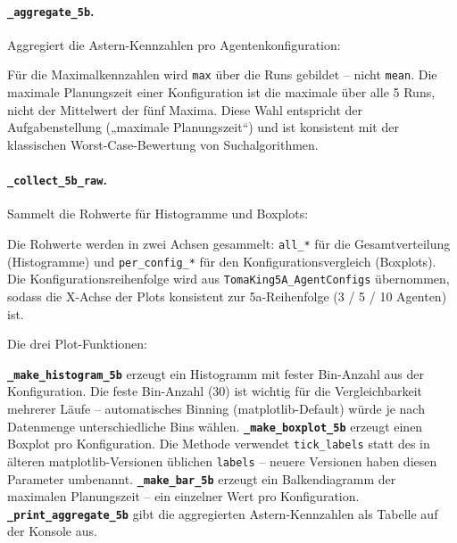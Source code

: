 

\paragraph{\texttt{\_aggregate\_5b}.}
Aggregiert die \acs{Astern}-Kennzahlen pro Agentenkonfiguration:



Für die Maximalkennzahlen wird \texttt{max} über die Runs gebildet -- nicht \texttt{mean}. Die maximale Planungszeit einer Konfiguration ist die maximale über alle 5 Runs, nicht der Mittelwert der fünf Maxima. Diese Wahl entspricht der Aufgabenstellung („maximale Planungszeit``) und ist konsistent mit der klassischen Worst-Case-Bewertung von Suchalgorithmen.

\paragraph{\texttt{\_collect\_5b\_raw}.}
Sammelt die Rohwerte für Histogramme und Boxplots:



Die Rohwerte werden in zwei Achsen gesammelt: \texttt{all\_*} für die Gesamtverteilung (Histogramme) und \texttt{per\_config\_*} für den Konfigurationsvergleich (Boxplots). Die Konfigurationsreihenfolge wird aus \texttt{TomaKing5A\_AgentConfigs} übernommen, sodass die X-Achse der Plots konsistent zur 5a-Reihenfolge (3 / 5 / 10 Agenten) ist.

Die drei Plot-Funktionen:



\textbf{\texttt{\_make\_histogram\_5b}} erzeugt ein Histogramm mit fester Bin-Anzahl aus der Konfiguration. Die feste Bin-Anzahl (30) ist wichtig für die Vergleichbarkeit mehrerer Läufe -- automatisches Binning (matplotlib-Default) würde je nach Datenmenge unterschiedliche Bins wählen.
\textbf{\texttt{\_make\_boxplot\_5b}} erzeugt einen Boxplot pro Konfiguration. Die Methode verwendet \texttt{tick\_labels} statt des in älteren matplotlib-Versionen üblichen \texttt{labels} -- neuere Versionen haben diesen Parameter umbenannt.
\textbf{\texttt{\_make\_bar\_5b}} erzeugt ein Balkendiagramm der maximalen Planungszeit -- ein einzelner Wert pro Konfiguration.
\textbf{\texttt{\_print\_aggregate\_5b}} gibt die aggregierten \acs{Astern}-Kennzahlen als Tabelle auf der Konsole aus.

